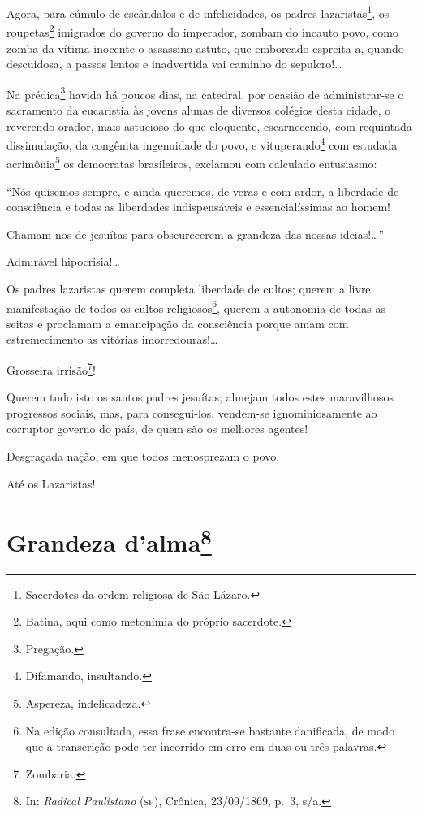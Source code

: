 Agora, para cúmulo de escândalos e de infelicidades, os padres
lazaristas\footnote{Sacerdotes da ordem religiosa de São Lázaro.}, os
roupetas\footnote{Batina, aqui como metonímia do próprio sacerdote.}
imigrados do governo do imperador, zombam do incauto povo, como zomba da
vítima inocente o assassino astuto, que emborcado espreita-a, quando
descuidosa, a passos lentos e inadvertida vai caminho do sepulcro!\ldots{}

Na prédica\footnote{Pregação.} havida há poucos dias, na catedral, por
ocasião de administrar-se o sacramento da eucaristia às jovens alunas de
diversos colégios desta cidade, o reverendo orador, mais astucioso do
que eloquente, escarnecendo, com requintada dissimulação, da congênita
ingenuidade do povo, e vituperando\footnote{Difamando, insultando.}
com estudada acrimônia\footnote{Aspereza, indelicadeza.} os democratas
brasileiros, exclamou com calculado entusiasmo:

``Nós quisemos sempre, e ainda queremos, de veras e com ardor, a
liberdade de consciência e todas as liberdades indispensáveis e
essencialíssimas ao homem!

Chamam-nos de jesuítas para obscurecerem a grandeza das nossas
ideias!\ldots{}''

Admirável hipocrisia!\ldots{}

Os padres lazaristas querem completa liberdade de cultos; querem a livre
manifestação de todos os cultos religiosos\footnote{Na edição
  consultada, essa frase encontra-se bastante danificada, de modo que a
  transcrição pode ter incorrido em erro em duas ou três palavras.},
querem a autonomia de todas as seitas e proclamam a emancipação da
consciência porque amam com estremecimento as vitórias
imorredouras!\ldots

Grosseira irrisão\footnote{Zombaria.}!

Querem tudo isto os santos padres jesuítas; almejam todos estes
maravilhosos progressos sociais, mas, para consegui-los, vendem-se
ignominiosamente ao corruptor governo do país, de quem são os melhores
agentes!

Desgraçada nação, em que todos menosprezam o povo.

Até os Lazaristas!

\chapter{Grandeza d'alma\footnote{In: \emph{Radical Paulistano} (\textsc{sp}),
  Crônica, 23/09/1869, p.~3, s/a.}}


